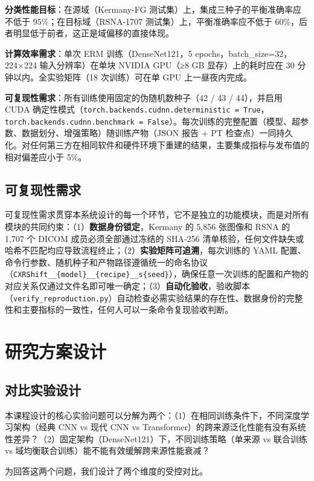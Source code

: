 \documentclass[12pt,a4paper,UTF8,openany]{ctexbook}
\begin{document}
\textbf{分类性能目标}：在源域（Kermany-FG 测试集）上，集成三种子的平衡准确率应不低于 95\%；在目标域（RSNA-1707 测试集）上，平衡准确率应不低于 60\%，后者明显低于前者，这正是域偏移的直接体现。

\textbf{计算效率需求}：单次 ERM 训练（DenseNet121，5 epochs，batch\_size=32，224×224 输入分辨率）在单块 NVIDIA GPU（≥8 GB 显存）上的耗时应在 30 分钟以内。全实验矩阵（18 次训练）可在单 GPU 上一昼夜内完成。

\textbf{可复现性需求}：所有训练使用固定的伪随机数种子（42 / 43 / 44），并启用 CUDA 确定性模式（\texttt{torch.backends.cudnn.deterministic = True}，\texttt{torch.backends.cudnn.benchmark = False}）。每次训练的完整配置（模型、超参数、数据划分、增强策略）随训练产物（JSON 报告 + PT 检查点）一同持久化。对任何第三方在相同软件和硬件环境下重建的结果，主要集成指标与发布值的相对偏差应小于 5\%。

\subsection{可复现性需求}

可复现性需求贯穿本系统设计的每一个环节，它不是独立的功能模块，而是对所有模块的共同约束：（1）\textbf{数据身份锁定}，Kermany 的 5,856 张图像和 RSNA 的 1,707 个 DICOM 成员必须全部通过冻结的 SHA-256 清单核验，任何文件缺失或哈希不匹配均应导致流程终止；（2）\textbf{实验矩阵可追溯}，每次训练的 YAML 配置、命令行参数、随机种子和产物路径遵循统一的命名协议（\texttt{CXRShift\_\_\{model\}\_\_\{recipe\}\_\_s\{seed\}}），确保任意一次训练的配置和产物的对应关系仅通过文件名即可唯一确定；（3）\textbf{自动化验收}，验收脚本（\texttt{verify\_reproduction.py}）自动检查必需实验结果的存在性、数据身份的完整性和主要指标的一致性，任何人可以一条命令复现验收判断。

\section{研究方案设计}

\subsection{对比实验设计}

本课程设计的核心实验问题可以分解为两个：（1）在相同训练条件下，不同深度学习架构（经典 CNN vs 现代 CNN vs Transformer）的跨来源泛化性能有没有系统性差异？（2）固定架构（DenseNet121）下，不同训练策略（单来源 vs 联合训练 vs 域均衡联合训练）能不能有效缓解跨来源性能衰减？

为回答这两个问题，我们设计了两个维度的受控对比。
\end{document}
